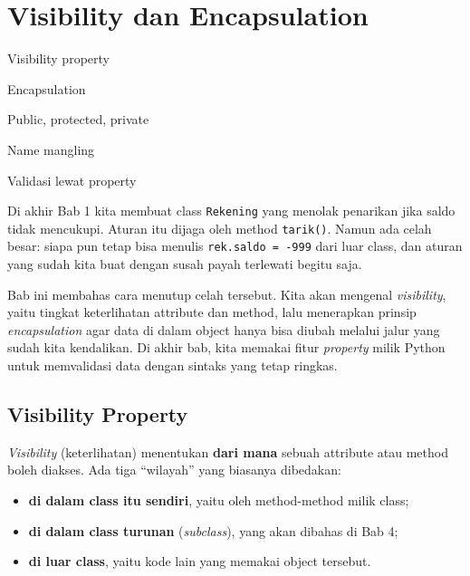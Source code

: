 \chapter{Visibility dan Encapsulation}

\begin{dibabini}
  \item Visibility property
  \item Encapsulation
  \item Public, protected, private
  \item Name mangling
  \item Validasi lewat property
\end{dibabini}

Di akhir Bab 1 kita membuat class \texttt{Rekening} yang menolak penarikan jika saldo tidak mencukupi. Aturan itu dijaga oleh method \texttt{tarik()}. Namun ada celah besar: siapa pun tetap bisa menulis \texttt{rek.saldo = -999} dari luar class, dan aturan yang sudah kita buat dengan susah payah terlewati begitu saja.

Bab ini membahas cara menutup celah tersebut. Kita akan mengenal \emph{visibility}, yaitu tingkat keterlihatan attribute dan method, lalu menerapkan prinsip \emph{encapsulation} agar data di dalam object hanya bisa diubah melalui jalur yang sudah kita kendalikan. Di akhir bab, kita memakai fitur \emph{property} milik Python untuk memvalidasi data dengan sintaks yang tetap ringkas.

\section{Visibility Property}

\emph{Visibility} (keterlihatan) menentukan \textbf{dari mana} sebuah attribute atau method boleh diakses. Ada tiga ``wilayah'' yang biasanya dibedakan:

\begin{itemize}
  \item \textbf{di dalam class itu sendiri}, yaitu oleh method-method milik class;
  \item \textbf{di dalam class turunan} (\emph{subclass}), yang akan dibahas di Bab 4;
  \item \textbf{di luar class}, yaitu kode lain yang memakai object tersebut.
\end{itemize}

